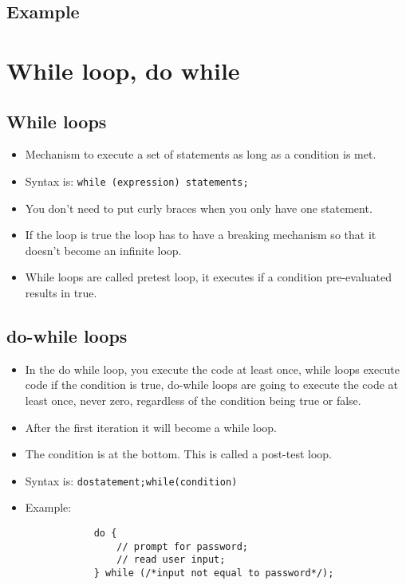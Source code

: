 \subsection{Example}


\section{While loop, do while}
\subsection{While loops}
\begin{itemize}
    \item Mechanism to execute a set of statements as long as a condition is met.
    \item Syntax is: \texttt{while (expression) {statements;}}
    \item You don't need to put curly braces when you only have one statement. 
    \item If the loop is true the loop has to have a breaking mechanism so that it doesn't become an infinite loop.
    \item While loops are called pretest loop, it executes if a condition pre-evaluated results in true.
\end{itemize}
\subsection{do-while loops}
\begin{itemize}
    \item In the do while loop, you execute the code at least once, while loops execute code if the condition is true, do-while loops are going to execute the code at least once, never zero, regardless of the condition being true or false. 
    \item After the first iteration it will become a while loop. 
    \item The condition is at the bottom. This is called a post-test loop.
    \item Syntax is: \texttt{do{statement;}while(condition)}
    \item Example: 
        \begin{verbatim}
            do { 
                // prompt for password; 
                // read user input; 
            } while (/*input not equal to password*/);
        \end{verbatim}
\end{itemize}

